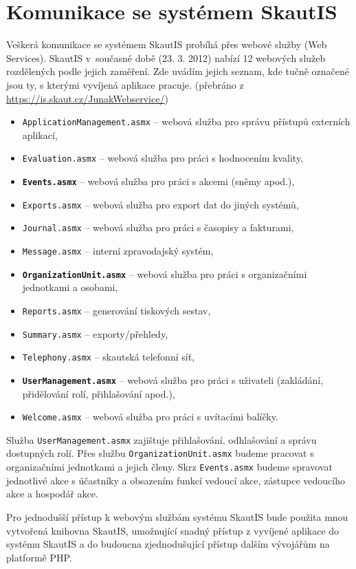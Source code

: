 \documentclass[thesis=B,czech]{FITthesis}[2011/06/14]
\begin{document}
\section{Komunikace se systémem SkautIS}\label{sec:skautisComunication}
Veškerá komunikace se systémem SkautIS probíhá přes webové služby (Web Services). SkautIS v~současné době (23. 3. 2012) nabízí 12 webových služeb rozdělených podle jejich zaměření. Zde uvádím jejich seznam, kde tučně označené jsou ty, s kterými vyvíjená aplikace pracuje. (přebráno z \url{https://is.skaut.cz/JunakWebservice/})
\begin{itemize}
	\item \texttt{ApplicationManagement.asmx} -- webová služba pro správu přístupů externích aplikací,
	\item \texttt{Evaluation.asmx} -- webová služba pro práci s hodnocením kvality,
	\item \texttt{\textbf{Events.asmx}} -- webová služba pro práci s akcemi (sněmy apod.),
	\item \texttt{Exports.asmx} -- webová služba pro export dat do jiných systémů,
	\item \texttt{Journal.asmx} -- webová služba pro práci s časopisy a fakturami,
	\item \texttt{Message.asmx} -- interní zpravodajský systém,
	\item \texttt{\textbf{OrganizationUnit.asmx}} -- webová služba pro práci s organizačními jednotkami a osobami,
	\item \texttt{Reports.asmx} -- generování tiskových sestav,
	\item \texttt{Summary.asmx} -- exporty/přehledy,
	\item \texttt{Telephony.asmx} -- skautská telefonní síť,
	\item \texttt{\textbf{UserManagement.asmx}} -- webová služba pro práci s uživateli (zakládání, přidělování rolí, přihlašování apod.),
	\item \texttt{Welcome.asmx} -- webová služba pro práci s uvítacími balíčky.
\end{itemize}

Služba \texttt{UserManagement.asmx} zajištuje přihlašování, odhlašování a správu dostupných rolí. Přes službu \texttt{OrganizationUnit.asmx} budeme pracovat s organizačními jednotkami a jejich členy. Skrz \texttt{Events.asmx} budeme spravovat jednotlivé akce s účastníky a obsazením funkcí vedoucí akce, zástupce vedoucího akce a hospodář akce.

Pro jednodušší přístup k webovým službám systému SkautIS bude použita mnou vytvořená knihovna SkautIS, umožnující snadný přístup z vyvíjené aplikace do systému SkautIS a do budoucna zjednodušující přístup dalším vývojářům na platformě PHP.
\end{document}
